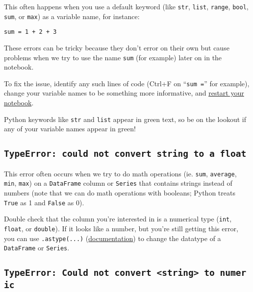 \documentclass[
  letterpaper,
  DIV=11,
  numbers=noendperiod]{scrreprt}
\begin{document}
This often happens when you use a default keyword (like \texttt{str},
\texttt{list}, \texttt{range}, \texttt{bool}, \texttt{sum}, or
\texttt{max}) as a variable name, for instance:

\begin{verbatim}
sum = 1 + 2 + 3
\end{verbatim}

These errors can be tricky because they don't error on their own but
cause problems when we try to use the name \texttt{sum} (for example)
later on in the notebook.

To fix the issue, identify any such lines of code (Ctrl+F on
``\texttt{sum\ =}'' for example), change your variable names to be
something more informative, and
\href{https://ds100.org/debugging-guide/jupyter101/jupyter101.html\#restarting-kernel}{restart
your notebook}.

Python keywords like \texttt{str} and \texttt{list} appear in green
text, so be on the lookout if any of your variable names appear in
green!

\subsection{\texorpdfstring{\texttt{TypeError:\ could\ not\ convert\ string\ to\ a\ float}}{TypeError: could not convert string to a float}}\label{typeerror-could-not-convert-string-to-a-float}

This error often occurs when we try to do math operations (ie.
\texttt{sum}, \texttt{average}, \texttt{min}, \texttt{max}) on a
\texttt{DataFrame} column or \texttt{Series} that contains strings
instead of numbers (note that we can do math operations with booleans;
Python treats \texttt{True} as 1 and \texttt{False} as 0).

Double check that the column you're interested in is a numerical type
(\texttt{int}, \texttt{float}, or \texttt{double}). If it looks like a
number, but you're still getting this error, you can use
\texttt{.astype(...)}
(\href{https://pandas.pydata.org/docs/reference/api/pandas.DataFrame.astype.html}{documentation})
to change the datatype of a \texttt{DataFrame} or \texttt{Series}.

\subsection{\texorpdfstring{\texttt{TypeError:\ Could\ not\ convert\ \textless{}string\textgreater{}\ to\ numeric}}{TypeError: Could not convert \textless string\textgreater{} to numeric}}\label{typeerror-could-not-convert-string-to-numeric}
\end{document}
